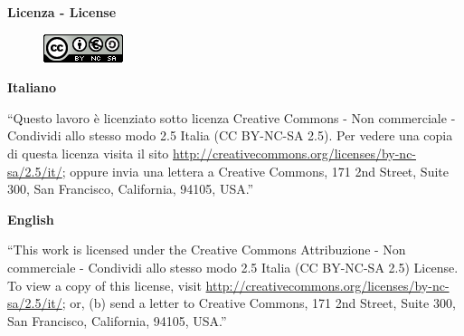 
\begin{center}\textbf{{\large Licenza - License}}\end{center}

\begin{figure}[hcbp]  
  \centering
  \includegraphics{../licenza/CreativeCommons/BY-NC-SA_2.5_IT/cc.png}
\end{figure}

\begin{center}\textbf{Italiano}\end{center}
“Questo lavoro è licenziato sotto licenza Creative Commons - Non commerciale - Condividi allo stesso modo 2.5 Italia (CC BY-NC-SA 2.5). Per vedere una copia di questa licenza visita il sito \url{http://creativecommons.org/licenses/by-nc-sa/2.5/it/}; oppure invia una lettera a Creative Commons, 171 2nd Street, Suite 300, San Francisco, California, 94105, USA.”\newline
\begin{center}\textbf{English}\end{center}
“This work is licensed under the Creative Commons Attribuzione - Non commerciale - Condividi allo stesso modo 2.5 Italia (CC BY-NC-SA 2.5) License. To view a copy of this license, visit \url{http://creativecommons.org/licenses/by-nc-sa/2.5/it/}; or, (b) send a letter to Creative Commons, 171 2nd Street, Suite 300, San Francisco, California, 94105, USA.” \newline

